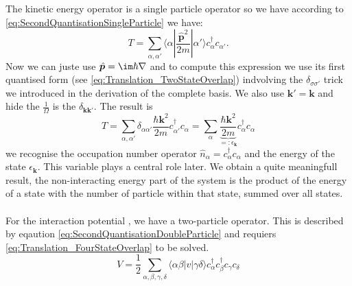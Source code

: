 \documentclass[../main.tex]{subfile}
\begin{document}
The kinetic energy operator is a single particle operator so we have according to \ref{eq:SecondQuantisationSingleParticle} we have:
\[
    T = \sum_{\alpha,\alpha'} \langle \alpha|\frac{\hat{\bm{p}}^2}{2m}|\alpha'\rangle c_{\alpha}^{\dagger}c_{\alpha'}.
\]
Now we can juste use $\hat{\bm{p}} = \im \hbar \nabla$ and to compute this expression we use its 
first quantised form (see \ref{eq:Translation_TwoStateOverlap}) indvolving the $\delta_{\sigma\sigma'}$ trick we introduced
in the derivation of the complete basis. We also use  $\bm{k}' = \bm{k}$ and hide the $\frac{1}{\Omega}$ is the $\delta_{\bm{k}\bm{k}'}$. The result is
\begin{equation}\label{eq:interactingGasT}
    T = \sum_{\alpha,\alpha'} \delta_{\alpha\alpha'} \frac{\hbar \bm{k}^2}{2m} c_{\alpha'}^{\dagger} c_{\alpha} = \sum_{\alpha} \underbrace{\frac{\hbar \bm{k}^2}{2m}}_{=:\epsilon_{\bm{k}}} c_{\alpha}^{\dagger} c_{\alpha}
\end{equation}
we recognise the occupation number operator $\hat{n}_{\alpha} = c_{\alpha}^{\dagger} c_{\alpha}$ and the energy of the state $\epsilon_{\bm{k}}$. This variable plays a central role later.
We obtain a quite meaningfull result, the non-interacting energy part of the system is the product of the energy of a 
state with the number of particle within that state, summed over all states.\\ 

\\

For the interaction potential , we have a two-particle operator. This is described by eqaution \ref{eq:SecondQuantisationDoubleParticle} and
requiers \ref{eq:Translation_FourStateOverlap} to be solved.
\[
    V = \frac{1}{2} \sum_{\alpha, \beta, \gamma,\delta} \langle \alpha \beta |v|\gamma\delta\rangle c_{\alpha}^{\dagger}c_{\beta}^{\dagger}c_{\gamma}c_{\delta}
\]
\end{document}
